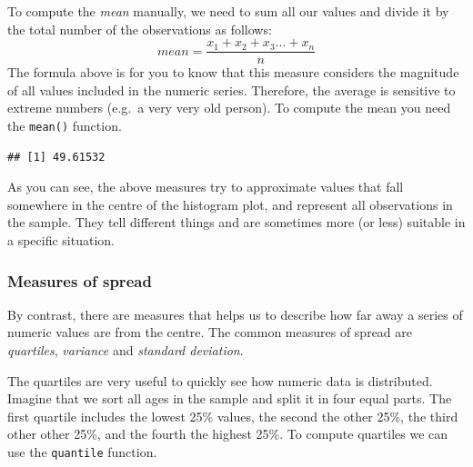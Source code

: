 \documentclass[
]{book}
\newenvironment{Shaded}{\begin{snugshade}}{\end{snugshade}}
\newcommand{\AttributeTok}[1]{\textcolor[rgb]{0.13,0.29,0.53}{#1}}
\newcommand{\FunctionTok}[1]{\textcolor[rgb]{0.13,0.29,0.53}{\textbf{#1}}}
\newcommand{\NormalTok}[1]{#1}
\newcommand{\SpecialCharTok}[1]{\textcolor[rgb]{0.81,0.36,0.00}{\textbf{#1}}}
\begin{document}
To compute the \emph{mean} manually, we need to sum all our values and divide it by the total number of the observations as follows:
\[ mean =\frac{  x_1 + x_2 + x_3 ...+x_n } {n} \]
The formula above is for you to know that this measure considers the magnitude of all values included in the numeric series. Therefore, the average is sensitive to extreme numbers (e.g.~a very very old person). To compute the mean you need the \texttt{mean()} function.

\begin{Shaded}
\end{Shaded}

\begin{verbatim}
## [1] 49.61532
\end{verbatim}

As you can see, the above measures try to approximate values that fall somewhere in the centre of the histogram plot, and represent all observations in the sample. They tell different things and are sometimes more (or less) suitable in a specific situation.

\hypertarget{measures-of-spread}{%
\subsubsection{Measures of spread}\label{measures-of-spread}}

By contrast, there are measures that helps us to describe how far away a series of numeric values are from the centre. The common measures of spread are \emph{quartiles}, \emph{variance} and \emph{standard deviation}.

The quartiles are very useful to quickly see how numeric data is distributed. Imagine that we sort all ages in the sample and split it in four equal parts. The first quartile includes the lowest 25\% values, the second the other 25\%, the third other other 25\%, and the fourth the highest 25\%. To compute quartiles we can use the \texttt{quantile} function.

\begin{Shaded}
\end{Shaded}
\end{document}
